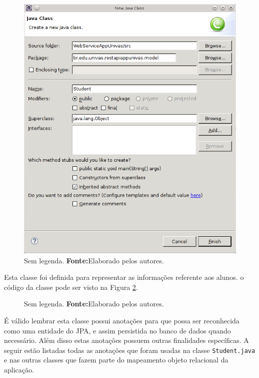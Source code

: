 	 \begin{figure}[h!]
		\centerline{\includegraphics[scale=0.8]{./imagens/2_q_metodologico/4_procedimentos_resultados/43_webservice/432_desenvolvimento/desws10.png}}
		\caption[Sem legenda]{Sem legenda.
			\textbf{Fonte:}Elaborado pelos autores.}
		\label{fig:desws10}
	\end{figure}
	
	\pagebreak

	\par Esta classe foi definida para representar as informações referente aos
alunos. o código da classe pode ser visto na Figura \ref{fig:desws11}. 
	
	
	\begin{figure}[h!]
		
		\caption[Sem legenda]{Sem legenda.
			\textbf{Fonte:}Elaborado pelos autores.}
		\label{fig:desws11}
	\end{figure}
	
	\pagebreak
	
	\par É válido lembrar esta classe possui anotações para que possa ser
reconhecida como uma entidade do JPA, e assim persistida no banco de dados
quando necessário. Além disso estas anotações possuem outras finalidades
específicas. A seguir estão listadas todas as anotações  que foram usadas na
classe \texttt{Student.java} e nas outras classes que fazem parte do mapeamento
objeto relacional da aplicação.

